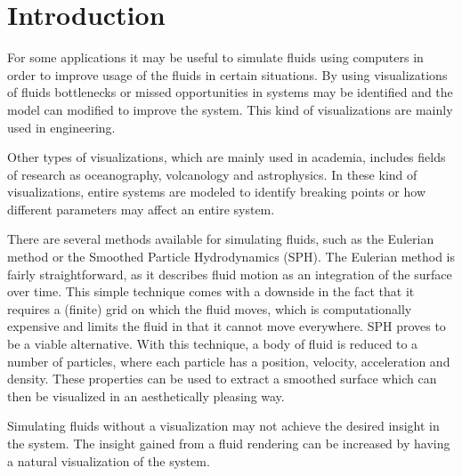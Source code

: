 \section{Introduction}

For some applications it may be useful to simulate fluids using computers in order to improve usage of the fluids in certain situations.
By using visualizations of fluids bottlenecks or missed opportunities in systems may be identified and the model can modified to improve the system.
This kind of visualizations are mainly used in engineering.

Other types of visualizations, which are mainly used in academia, includes fields of research as oceanography, volcanology and astrophysics. 
In these kind of visualizations, entire systems are modeled to identify breaking points or how different parameters may affect an entire system.

There are several methods available for simulating fluids, such as the Eulerian method or the Smoothed Particle Hydrodynamics (SPH). The Eulerian method is fairly straightforward, as it describes fluid motion as an integration of the surface over time. 
This simple technique comes with a downside in the fact that it requires a (finite) grid on which the fluid moves, which is computationally expensive and limits the fluid in that it cannot move everywhere.
SPH proves to be a viable alternative. 
With this technique, a body of fluid is reduced to a number of particles, where each particle has a position, velocity, acceleration and density.
These properties can be used to extract a smoothed surface which can then be visualized in an aesthetically pleasing way. 	

Simulating fluids without a visualization may not achieve the desired insight in the system. 
The insight gained from a fluid rendering can be increased by having a natural visualization of the system. 